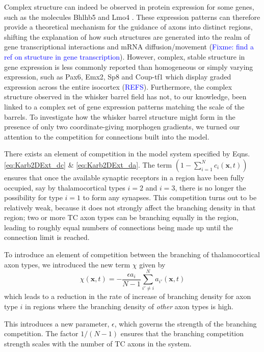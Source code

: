 \documentclass[a4paper,11pt]{article}
\newcommand{\cmnt}[1]{\textcolor{blue}{#1}}
\newcommand{\e}{\emph}
\newcommand{\mb}[1]{\mathbf{#1}}
\begin{document}
Complex structure can indeed be observed in protein expression for some genes,
such as the molecules Bhlhb5 \citep{Joshi2008} and Lmo4
\citep{Cederquist2013,Greig2013}. These expression patterns can therefore
provide a theoretical mechanism for the guidance of axons into distinct
regions, shifting the explanation of how such structures are generated into
the realm of gene transcriptional interactions and mRNA diffusion/movement
(\cmnt{Fixme: find a ref on structure in gene transcription}). However,
complex, stable structure in gene expression is less commonly reported than
homogeneous or simply varying expression, such as Pax6, Emx2, Sp8 and Coup-tf1 which
display graded expression across the entire isocortex
(\cmnt{REFS}). Furthermore, the complex structure observed in the whisker
barrel field has not, to our knowledge, been linked to a complex set of gene
expression patterns matching the scale of the barrels. To investigate how the
whisker barrel structure might form in the presence of only two
coordinate-giving morphogen gradients, we turned our attention to the
competition for connections built into the model.

There exists an element of competition in the model system specified by
Eqns. \ref{eq:Karb2DExt_dc} \& \ref{eq:Karb2DExt_da}. The term $\left(1 -
\sum_{i=1}^{N} c_i(\mb{x}, t)\right)$ ensures that once the available synaptic
receptors in a region have been fully occupied, say by thalamocortical types
$i=2$ and $i=3$, there is no longer the possibility for type $i=1$ to form any
synapses. This competition turns out to be relatively weak, because it does
not strongly affect the branching density in that region; two or more TC axon
types can be branching equally in the region, leading to roughly equal numbers
of connections being made up until the connection limit is reached.

To introduce an element of competition between the branching of
thalamocortical axon types, we introduced the new term $\chi$ given by
%
\begin{equation} \label{eq:branch_comp}
\chi(\mb{x}, t) = - \frac{\epsilon  a_i}{N-1} \sum_{i' \ne i}^{N} a_{i'}(\mb{x}, t)
\end{equation}
%
which leads to a reduction in the rate of increase of branching density for
axon type $i$ in regions where the branching density of \e{other} axon
types is high.

This introduces a new parameter, $\epsilon$, which governs the
strength of the branching competition. The factor $1/(N-1)$ ensures that the
branching competition strength scales with the number of TC axons in the
system.
\end{document}
